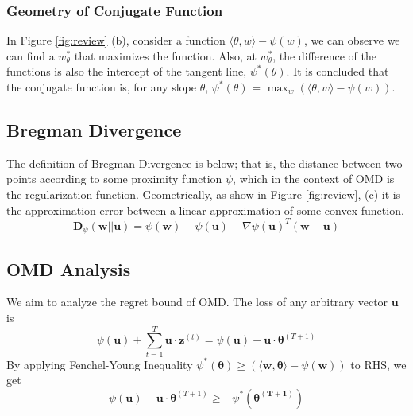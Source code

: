 \documentclass[11pt]{article}
\newcommand{\argmax}[1]{\underset{#1}{\operatorname{arg}\,\operatorname{max}}\;}
\begin{document}
\subsubsection{Geometry of Conjugate Function}
In Figure \ref{fig:review} (b), consider a function $\big \langle \theta, w \big \rangle - \psi(w)$, we can observe we can find a $w_\theta^*$ that maximizes the function. Also, at $w_\theta^*$, the difference of the functions is also the intercept of the tangent line, $\psi^*(\theta)$. It is concluded that the conjugate function is, for any slope $\theta$, $\psi^*(\theta)$ = $\max_{w}(\big \langle \theta, w \big \rangle - \psi(w))$.





\subsection{Bregman Divergence}
The definition of Bregman Divergence is below; that is, the distance between two points according to some proximity function $\psi$, which in the context of OMD is the regularization function. Geometrically, as show in Figure \ref{fig:review}, (c) it is the approximation error between a linear approximation of some convex function.
$$
    \bm{D}_\psi(\bm{w}||\bm{u}) = \psi(\bm{w}) - \psi(\bm{u}) - \nabla\psi(\bm{u})^T(\bm{w} - \bm{u})
$$

\vspace{-3mm}
\subsection{OMD Analysis}
We aim to analyze the regret bound of OMD. The loss of any arbitrary vector $\bm{u}$ is
$$
\psi(\bm{u}) + \sum_{t=1}^T \bm{u} \cdot \bm{z}^{(t)} = \psi(\bm{u}) - \bm{u} \cdot \bm{\theta}^{(T+1)}
$$
By applying Fenchel-Young Inequality $\psi^*(\bm{\theta}) \geq (\big \langle \bm{w}, \bm{\theta} \big \rangle - \psi(\bm{w}))$ to RHS, we get
$$
\psi(\bm{u}) - \bm{u} \cdot \bm{\theta}^{(T+1)} \geq -\psi^*(\bm{\theta^{(T+1)}})
$$
\end{document}
